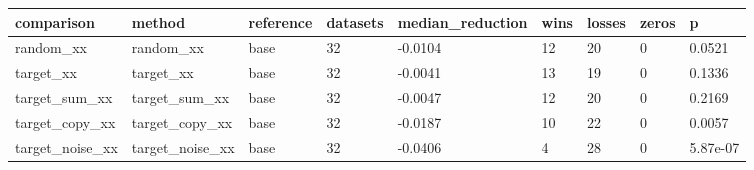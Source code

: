 \begin{tabular}{lllllllll}
\toprule
comparison & method & reference & datasets & median\_reduction & wins & losses & zeros & p \\
\midrule
random\_xx & random\_xx & base & 32 & -0.0104 & 12 & 20 & 0 & 0.0521 \\
target\_xx & target\_xx & base & 32 & -0.0041 & 13 & 19 & 0 & 0.1336 \\
target\_sum\_xx & target\_sum\_xx & base & 32 & -0.0047 & 12 & 20 & 0 & 0.2169 \\
target\_copy\_xx & target\_copy\_xx & base & 32 & -0.0187 & 10 & 22 & 0 & 0.0057 \\
target\_noise\_xx & target\_noise\_xx & base & 32 & -0.0406 & 4 & 28 & 0 & 5.87e-07 \\
\bottomrule
\end{tabular}
